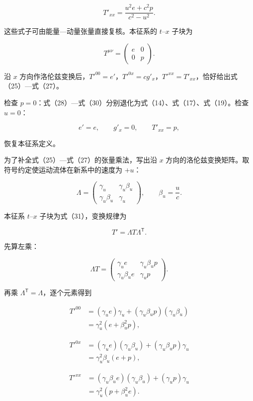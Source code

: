 \documentclass[12pt,a4paper,UTF8]{ctexart}
\begin{document}
\[
\boxed{
T'_{xx}=\frac{u^2e+c^2p}{c^2-u^2}
}. \tag{30}
\]

这些式子可由能量---动量张量直接复核。本征系的 \(t\)--\(x\) 子块为

\[
T^{\mu\nu}
=\begin{pmatrix}
e&0\\
0&p
\end{pmatrix}. \tag{31}
\]

沿 \(x\)
方向作洛伦兹变换后，\(T'^{00}=e'\)，\(T'^{0x}=cg'_x\)，\(T'^{xx}=T'_{xx}\)，恰好给出式（25）---式（27）。

检查
\(p=0\)：式（28）---式（30）分别退化为式（14）、式（17）、式（19）。检查
\(u=0\)：

\[
e'=e,\qquad g'_x=0,\qquad T'_{xx}=p, \tag{32}
\]

恢复本征系定义。

为了补全式（25）---式（27）的张量乘法，写出沿 \(x\)
方向的洛伦兹变换矩阵。取符号约定使运动流体在新系中的速度为 \(+u\)：

\[
\Lambda=
\begin{pmatrix}
\gamma_u&\gamma_u\beta_u\\
\gamma_u\beta_u&\gamma_u
\end{pmatrix},
\qquad
\beta_u=\frac uc. \tag{33}
\]

本征系 \(t\)--\(x\) 子块为式（31），变换规律为

\[
T'=\Lambda T\Lambda^{\mathsf T}. \tag{34}
\]

先算左乘：

\[
\Lambda T
=
\begin{pmatrix}
\gamma_u e&\gamma_u\beta_u p\\
\gamma_u\beta_u e&\gamma_u p
\end{pmatrix}. \tag{35}
\]

再乘 \(\Lambda^{\mathsf T}=\Lambda\)，逐个元素得到

\[
\begin{aligned}
T'^{00}
&=(\gamma_u e)\gamma_u
+(\gamma_u\beta_u p)(\gamma_u\beta_u)\\
&=\gamma_u^2(e+\beta_u^2p),
\end{aligned} \tag{36}
\]

\[
\begin{aligned}
T'^{0x}
&=(\gamma_u e)(\gamma_u\beta_u)
+(\gamma_u\beta_u p)\gamma_u\\
&=\gamma_u^2\beta_u(e+p),
\end{aligned} \tag{37}
\]

\[
\begin{aligned}
T'^{xx}
&=(\gamma_u\beta_u e)(\gamma_u\beta_u)
+(\gamma_u p)\gamma_u\\
&=\gamma_u^2(p+\beta_u^2e).
\end{aligned} \tag{38}
\]
\end{document}
